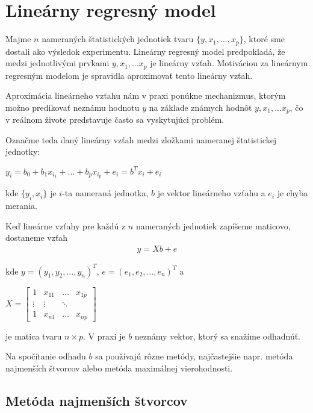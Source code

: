 \section{Lineárny regresný model}
\label{linear regression}
 
Majme $n$ nameraných štatistických jednotiek tvaru $\{ y, x_1, \ldots, x_p \}$, 
ktoré sme dostali ako výsledok experimentu. 
Lineárny regresný model predpokladá, že medzi jednotlivými prvkami $y, x_1, ... x_p$ je lineárny vzťah. 
Motiváciou za lineárnym regresným modelom je spravidla aproximovať tento lineárny vzťah.

Aproximácia lineárneho vzťahu nám v praxi ponúkne mechanizmus, 
ktorým možno predikovať neznámu hodnotu $y$ na základe známych hodnôt $y, x_1, ... x_p$, 
čo v reálnom živote predstavuje často sa vyskytujúci problém.

Označme teda daný lineárny vzťah medzi zložkami nameranej štatistickej jednotky:

\begin{center}
$
y_i = b_0 + b_1 x_{i_1} + … + b_p x_{i_p} + e_i = b^T x_i + e_i
$
\end{center}

kde $\{ y_i, x_i \}$ je $i$-ta nameraná jednotka, $b$ je vektor lineárneho vzťahu
a $e_i$ je chyba merania.

Keď lineárne vzťahy pre každú z $n$ nameraných jednotiek zapíšeme maticovo, dostaneme vzťah
\begin{align}
\label{linear regression formula}
y = Xb + e
\end{align}

kde $y = (y_1, y_2, \ldots, y_n)^T$, $e = (e_1, e_2, \ldots, e_n)^T$ a

\begin{center}
$
X =
\begin{bmatrix}
1 & x_{11} & \ldots & x_{1p} \\
\vdots & \vdots & \ddots & \\
1 & x_{n1} & \ldots & x_{np} 
\end{bmatrix}
$
\end{center}

je matica tvaru $n \times p$. V praxi je $b$ neznámy vektor, ktorý sa snažíme odhadnúť.

Na spočítanie odhadu $b$ sa používajú rôzne metódy,
najčastejšie napr. metóda najmenších štvorcov alebo metóda maximálnej vierohodnosti.

\subsection{Metóda najmenších štvorcov}

